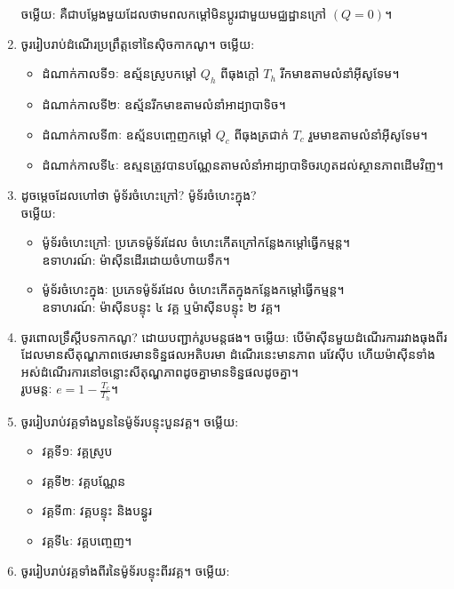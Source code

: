 \documentclass{officialexam}
\begin{document}
\begin{enumerate}[m]
		{\color{red}\sffamily ចម្លើយ}: គឺជាបម្លែងមួយដែលថាមពលកម្តៅមិនប្តូរជាមួយមជ្ឈដ្ឋានក្រៅ $\left(Q=0\right)$។
		\item ចូររៀបរាប់ដំណើរប្រព្រឹត្តទៅនៃសុិចកាកណូ។
		{\color{red}\sffamily ចម្លើយ}:
		\begin{itemize}
			\item ដំណាក់កាលទី១ៈ ឧស្ម័នស្រូបកម្តៅ $Q_{h}$ ពីធុងក្តៅ $T_{h}$ រីកមាឌតាមលំនាំអុីសូទែម។
			\item ដំណាក់កាលទី២ៈ ឧស្ម័នរីកមាឌតាមលំនាំអាដ្យាបាទិច។
			\item ដំណាក់កាលទី៣ៈ ឧស្ម័នបញ្ចេញកម្តៅ $Q_{c}$ ពីធុងត្រជាក់ $T_{c}$ រួមមាឌតាមលំនាំអុីសូទែម។
			\item ដំណាក់កាលទី៤ៈ ឧស្មនត្រូវបានបណ្ណែនតាមលំនាំអាដ្យាបាទិចរហូតដល់ស្ថានភាពដើមវិញ។
		\end{itemize}
		\item ដូចម្តេចដែលហៅថា ម៉ូទ័រចំហេះក្រៅ? ម៉ូទ័រចំហេះក្នុង?\\
		{\color{red}\sffamily ចម្លើយ}:
		\begin{itemize}
			\item ម៉ូទ័រចំហេះក្រៅៈ ប្រភេទម៉ូទ័រដែល ចំហេះកើតក្រៅកន្លែងកម្តៅធ្វើកម្មន្ត។\\
			{\color{red}\sffamily ឧទាហរណ៍}: ម៉ាសុីនដើរដោយចំហាយទឹក។
			\item ម៉ូទ័រចំហេះក្នុងៈ ប្រភេទម៉ូទ័រដែល ចំហេះកើតក្នុងកន្លែងកម្តៅធ្វើកម្មន្ត។\\
			{\color{red}\sffamily ឧទាហរណ៍}: ម៉ាសុីនបន្ទុះ ៤ វគ្គ ឬម៉ាសុីនបន្ទុះ ២ វគ្គ។
		\end{itemize}
		\item ចូរពោលទ្រឹស្តីបទកាកណូ? ដោយបញ្ជាក់រូបមន្តផង។
		{\color{red}\sffamily ចម្លើយ}: បើម៉ាសុីនមួយដំណើរការរវាងធុងពីរដែលមានសីតុណ្ហភាពថេរមានទិន្នផលអតិបរមា ដំណើរនេះមានភាព រេវែសុីប ហើយម៉ាសុីនទាំងអស់ដំណើរការនៅចន្លោះសីតុណ្ហភាពដូចគ្នាមានទិន្នផលដូចគ្នា។\\
		រូបមន្តៈ $e=1-\frac{T_{c}}{T_{h}}$។
		\item ចូររៀបរាប់វគ្គទាំងបួននៃម៉ូទ័របន្ទុះបួនវគ្គ។ {\color{red}\sffamily ចម្លើយ}:
		\begin{multicols}{4}
			\begin{itemize}
				\item វគ្គទី១ៈ វគ្គស្រូប
				\item វគ្គទី២ៈ វគ្គបណ្ណែន
				\item វគ្គទី៣ៈ វគ្គបន្ទុះ និងបន្ធូរ
				\item វគ្គទី៤ៈ វគ្គបញ្ចេញ។
			\end{itemize}
		\end{multicols}
		\item ចូររៀបរាប់វគ្គទាំងពីរនៃម៉ូទ័របន្ទុះពីរវគ្គ។ ​{\color{red}\sffamily ចម្លើយ}:

\end{enumerate}
\end{document}
